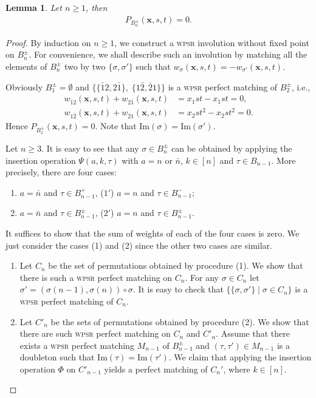 \documentclass[12pt,reqno]{amsart}
\numberwithin{equation}{section}
\newcounter{num}
\def\x{\mathbf{ x}}
\newtheorem{lem}{Lemma}
\begin{document}
\begin{lem}\label{lem6}
	Let $n\ge1$, then
	\begin{align}\label{eq:lem6}
		P_{B_n^\pm}(\x,s,t)=0.
	\end{align}
\end{lem}
\begin{proof}
By induction on $n\geq 1$,
we construct a \textsc{wpsr}  involution without fixed point on 
$B_n^\pm$.  For convenience, we shall describe such an involution by matching all the elements of $B_n^\pm$ two by two $\{\sigma, \sigma'\}$ such that  
$w_\sigma(\x,s,t)=-w_{\sigma'}(\x,s,t)$. 
 
Obviously $B_1^\pm=\emptyset$ and  $\{\{\bar{1}2, 2\bar{1}\}, \; \{1\bar{2}, \overline{2}1\}\}$ is a
\textsc{wpsr}  perfect matching of $B_2^\pm$, i.e.,
\begin{align*}
w_{\bar{1}2}(\x,s,t)+w_{2\bar{1}}(\x,s,t)&= x_1st-x_1st  =0,\\ 
w_{1\bar{2}}(\x,s,t)+w_{\overline{2}1}(\x,s,t)&= x_2st^2-x_2st^2=0.
\end{align*}
Hence $P_{B_2^\pm}(\x,s,t)=0$. Note that $\mathrm{Im}(\sigma)=\mathrm{Im}(\sigma')$.


Let $n\geq 3$.  It is easy to see that 
any $ \sigma\in B^{\pm}_n$ can be obtained 
by applying the insertion operation  $\Psi(a,k, \tau)$ with 
$a=n$ or $\bar n$,  $k\in [n]$  and $\tau\in B_{n-1}$. More precisely, there are four cases:
\begin{enumerate}
\item $a=\bar{n}$ and $\tau\in B^+_{n-1}$,  ($1'$) $a=n$ and  $\tau\in B^-_{n-1}$;
\item $a=\bar{n}$ and $\tau\in B^{\pm}_{n-1}$,  ($2'$) $a=n$ and $\tau\in B^{\pm}_{n-1}$.
\end{enumerate}

It suffices to show that the sum of weights of each of the four cases is zero. 
We just consider the cases (1) and (2) since the other two cases are similar.


\begin{enumerate}
\item	
Let $C_n$  be the set of permutations obtained by procedure (1). 
We show that there is such a \textsc{wpsr} perfect matching on $C_n$.
For  any $\sigma\in C_n$ let 
	$\sigma'=(\sigma(n-1),\sigma(n))\circ\sigma$. 
	It is easy to check that $\{\{\sigma,\sigma'\}\mid \sigma\in C_n\}$   is a \textsc{wpsr} perfect matching of $C_n$.
\item 		
Let $C'_n$ be the sets of permutations obtained by 
procedure (2). 
We show that there are such \textsc{wpsr} perfect matching on $C_n$ and $C'_n$.
Assume that there exists a \textsc{wpsr} perfect matching $M_{n-1}$  of $B^{\pm}_{n-1}$ and $(\tau,\tau')\in M_{n-1}$ is a doubleton such that 
$\mathrm{Im}(\tau)=\mathrm{Im}(\tau')$.
We claim that applying the insertion operation
 $\Phi$ on $C'_{n-1}$ yields a perfect matching of $C_n'$, where $k\in [n]$.
	

\end{enumerate}
\end{proof}
\end{document}

